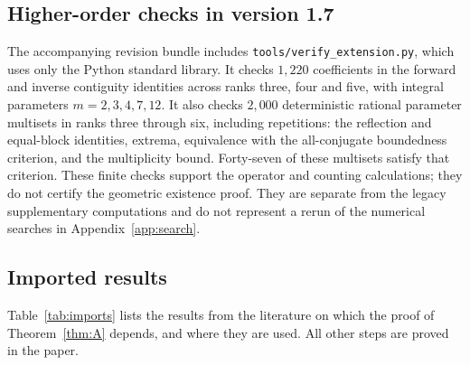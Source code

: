 \documentclass[11pt]{amsart}
\theoremstyle{definition}
\theoremstyle{remark}
\numberwithin{equation}{section}
\begin{document}
\subsection*{Higher-order checks in version 1.7}
The accompanying revision bundle includes \texttt{tools/verify\_extension.py}, which uses only the Python standard library. It checks $1{,}220$ coefficients in the forward and inverse contiguity identities across ranks three, four and five, with integral parameters $m=2,3,4,7,12$. It also checks $2{,}000$ deterministic rational parameter multisets in ranks three through six, including repetitions: the reflection and equal-block identities, extrema, equivalence with the all-conjugate boundedness criterion, and the multiplicity bound. Forty-seven of these multisets satisfy that criterion. These finite checks support the operator and counting calculations; they do not certify the geometric existence proof. They are separate from the legacy supplementary computations and do not represent a rerun of the numerical searches in Appendix~\ref{app:search}.

\subsection*{Imported results}
Table~\ref{tab:imports} lists the results from the literature on which the proof of Theorem~\ref{thm:A} depends, and where they are used. All other steps are proved in the paper.
\end{document}
